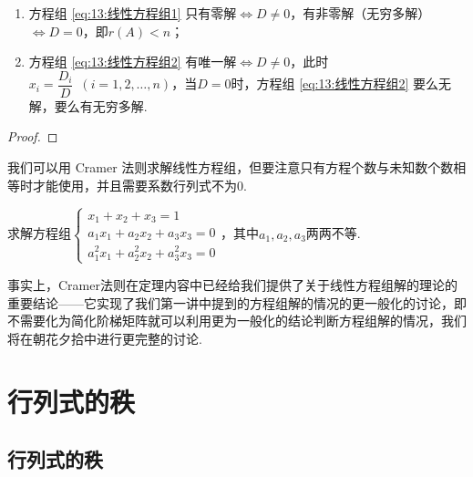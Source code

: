 \begin{theorem}
    \begin{enumerate}
        \item 方程组 \ref{eq:13:线性方程组1} 只有零解$\iff D \neq 0$，有非零解（无穷多解）$\iff D=0$，即$r(A)<n$；

        \item 方程组 \ref{eq:13:线性方程组2} 有唯一解$\iff D \neq 0$，此时$x_i=\dfrac{D_i}{D}\enspace(i=1,2,\ldots,n)$，当$D=0$时，方程组 \ref{eq:13:线性方程组2} 要么无解，要么有无穷多解.
    \end{enumerate}
\end{theorem}

\begin{proof}

\end{proof}

我们可以用 Cramer 法则求解线性方程组，但要注意只有方程个数与未知数个数相等时才能使用，并且需要系数行列式不为0.
\begin{example}
    求解方程组$\begin{cases}
            x_1+x_2+x_3=1          \\
            a_1x_1+a_2x_2+a_3x_3=0 \\
            a_1^2x_1+a_2^2x_2+a_3^2x_3=0
        \end{cases}$，其中$a_1,a_2,a_3$两两不等.
\end{example}

\begin{solution}

\end{solution}

事实上，Cramer法则在定理内容中已经给我们提供了关于线性方程组解的理论的重要结论——它实现了我们第一讲中提到的方程组解的情况的更一般化的讨论，即不需要化为简化阶梯矩阵就可以利用更为一般化的结论判断方程组解的情况，我们将在朝花夕拾中进行更完整的讨论.

\section{行列式的秩}

\subsection{行列式的秩}

